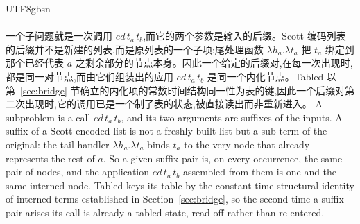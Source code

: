\begin{CJK*}{UTF8}{gbsn}
  \paragraph{}
  \ifTablambdaChinese
  一个子问题就是一次调用 $\mathit{ed}\,t_a\,t_b$,而它的两个参数是输入的后缀。Scott 编码列表的后缀并不是新建的列表,而是原列表的一个子项:尾处理函数 $\lambda h_a.\lambda t_a$ 把 $t_a$ 绑定到那个已经代表 $a$ 之剩余部分的节点本身。因此一个给定的后缀对,在每一次出现时,都是同一对节点,而由它们组装出的应用 $\mathit{ed}\,t_a\,t_b$ 是同一个内化节点。\textsf{Tabled} 以第~\ref{sec:bridge} 节确立的内化项的常数时间结构同一性为表的键,因此一个后缀对第二次出现时,它的调用已是一个制了表的状态,被直接读出而非重新进入。
  \else
  A subproblem is a call $\mathit{ed}\,t_a\,t_b$, and its two arguments are suffixes of the inputs. A suffix of a Scott-encoded list is not a freshly built list but a sub-term of the original: the tail handler $\lambda h_a.\lambda t_a$ binds $t_a$ to the very node that already represents the rest of $a$. So a given suffix pair is, on every occurrence, the same pair of nodes, and the application $\mathit{ed}\,t_a\,t_b$ assembled from them is one and the same interned node. \textsf{Tabled} keys its table by the constant-time structural identity of interned terms established in Section~\ref{sec:bridge}, so the second time a suffix pair arises its call is already a tabled state, read off rather than re-entered.
  \fi


\end{CJK*}
